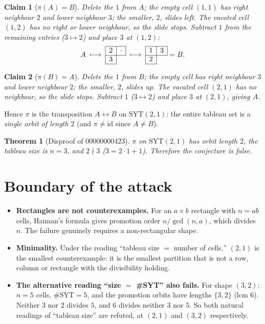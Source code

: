 \documentclass{article}
\newtheorem{theorem}{Theorem}
\newtheorem{claim}{Claim}
\begin{document}
\begin{claim}[$\pi(A)=B$]\label{cl:A}
Delete the $1$ from $A$; the empty cell $(1,1)$ has right neighbour $2$ and
lower neighbour $3$; the smaller, $2$, slides left. The vacated cell $(1,2)$
has no right or lower neighbour, so the slide stops. Subtract $1$ from the
remaining entries ($3\mapsto 2$) and place $3$ at $(1,2)$:
\[
A\;\longmapsto\;\begin{array}{|c|c|}\hline 2&\cdot\\\cline{1-2}\multicolumn{1}{|c|}{3}&\multicolumn{1}{c}{}\\\cline{1-1}\end{array}
\;\longmapsto\;\begin{array}{|c|c|}\hline 1&3\\\cline{1-2}\multicolumn{1}{|c|}{2}&\multicolumn{1}{c}{}\\\cline{1-1}\end{array}=B.
\]
\end{claim}

\begin{claim}[$\pi(B)=A$]\label{cl:B}
Delete the $1$ from $B$; the empty cell has right neighbour $3$ and lower
neighbour $2$; the smaller, $2$, slides up. The vacated cell $(2,1)$ has no
neighbour, so the slide stops. Subtract $1$ ($3\mapsto 2$) and place $3$ at
$(2,1)$, giving $A$.
\end{claim}

Hence $\pi$ is the transposition $A\leftrightarrow B$ on
$\mathrm{SYT}(2,1)$: the entire tableau set is a \emph{single orbit of length
$2$} (and $\pi\neq\mathrm{id}$ since $A\neq B$).

\begin{theorem}[Disproof of 00000000423]\label{thm:main}
$\pi$ on $\mathrm{SYT}(2,1)$ has orbit length $2$, the tableau size is $n=3$,
and $2\nmid 3$ ($3 = 2\cdot 1 + 1$). Therefore the conjecture is false.
\end{theorem}

\section{Boundary of the attack}

\begin{itemize}
\item \textbf{Rectangles are not counterexamples.} For an $a\times b$
rectangle with $n=ab$ cells, Haiman's formula gives promotion order
$n/\gcd(n,a)$, which divides $n$. The failure genuinely requires a
non-rectangular shape.
\item \textbf{Minimality.} Under the reading ``tableau size $=$ number of
cells,'' $(2,1)$ is the smallest counterexample: it is the smallest partition
that is not a row, column or rectangle with the divisibility holding.
\item \textbf{The alternative reading ``size $=$ \#SYT'' also fails.} For
shape $(3,2)$: $n=5$ cells, $\#\mathrm{SYT}=5$, and the promotion orbits have
lengths $\{3,2\}$ (lcm $6$). Neither $3$ nor $2$ divides $5$, and $6$ divides
neither $3$ nor $5$. So both natural readings of ``tableau size'' are
refuted, at $(2,1)$ and $(3,2)$ respectively.
\end{itemize}
\end{document}
